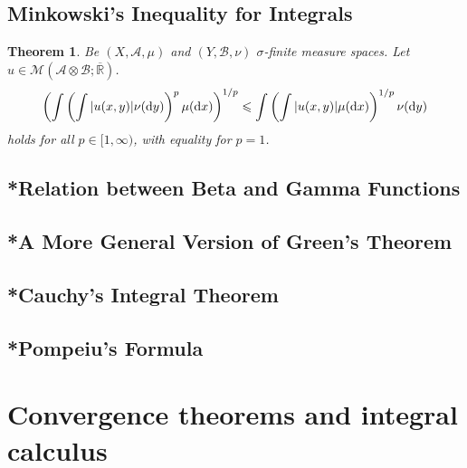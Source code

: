 \documentclass[11pt, a4paper, openany]{book}
\newtheorem{thm}{Theorem}\newtheorem{lem}{Lemma}\newtheorem{crl}{Corollary}
\theoremstyle{definition}
\begin{document}
\subsection{Minkowski's Inequality for Integrals}
    \begin{thm}
        Be $(X,\mathscr{A},\mu)$ and $(Y,\mathscr{B},\nu)$ $\sigma$-finite measure spaces. Let $u\in\mathcal{M}(\mathscr{A}\otimes\mathscr{B};\overline{\mathbb{R}})$.
        \[\left(\int\left(\int|u(x,y)|\nu(\odif y)\right)^p\mu(\odif x)\right)^{1/p}\leqslant \int\left(\int |u(x,y)|\mu(\odif x)\right)^{1/p}\nu(\odif y)\]
        holds for all $p\in [1,\infty)$, with equality for $p=1$.
    \end{thm}
\subsection{*Relation between Beta and Gamma Functions}
\subsection{*A More General Version of Green's Theorem}
\subsection{*Cauchy's Integral Theorem}
\subsection{*Pompeiu's Formula}
\section{Convergence theorems and integral calculus}
\end{document}
